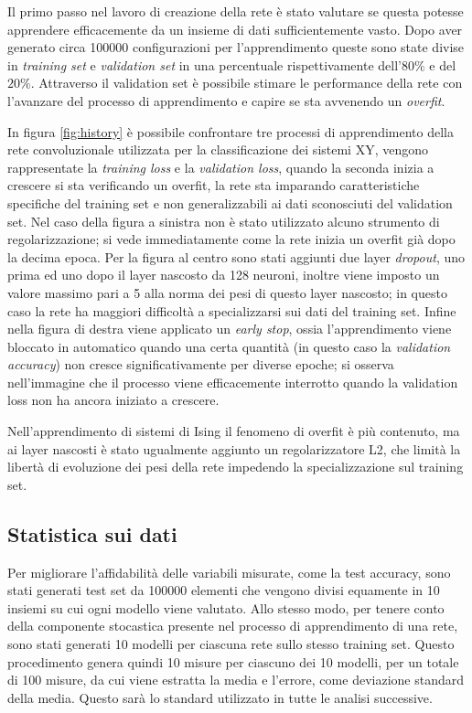 \documentclass{article}
\begin{document}
Il primo passo nel lavoro di creazione della rete è stato valutare se questa potesse apprendere efficacemente da un insieme di dati sufficientemente vasto.
Dopo aver generato circa \num{100000} configurazioni per l'apprendimento queste sono state divise in \emph{training set} e \emph{validation set} in una percentuale rispettivamente dell'$80\%$ e del $20\%$.
Attraverso il validation set è possibile stimare le performance della rete con l'avanzare del processo di apprendimento e capire se sta avvenendo un \emph{overfit}.

In figura \ref{fig:history} è possibile confrontare tre processi di apprendimento della rete convoluzionale utilizzata per la classificazione dei sistemi XY, vengono rappresentate la \emph{training loss} e la \emph{validation loss}, quando la seconda inizia a crescere si sta verificando un overfit, la rete sta imparando caratteristiche specifiche del training set e non generalizzabili ai dati sconosciuti del validation set.
Nel caso della figura a sinistra non è stato utilizzato alcuno strumento di regolarizzazione; si vede immediatamente come la rete inizia un overfit già dopo la decima epoca.
Per la figura al centro sono stati aggiunti due layer \emph{dropout}, uno prima ed uno dopo il layer nascosto da 128 neuroni, inoltre viene imposto un valore massimo pari a 5 alla norma dei pesi di questo layer nascosto; in questo caso la rete ha maggiori difficoltà a specializzarsi sui dati del training set.
Infine nella figura di destra viene applicato un \emph{early stop}, ossia l'apprendimento viene bloccato in automatico quando una certa quantità (in questo caso la \emph{validation accuracy}) non cresce significativamente per diverse epoche; si osserva nell'immagine che il processo viene efficacemente interrotto quando la validation loss non ha ancora iniziato a crescere.

Nell'apprendimento di sistemi di Ising il fenomeno di overfit è più contenuto, ma ai layer nascosti è stato ugualmente aggiunto un regolarizzatore L2, che limità la libertà di evoluzione dei pesi della rete impedendo la specializzazione sul training set.

\subsection{Statistica sui dati} \label{sec:stats}
Per migliorare l'affidabilità delle variabili misurate, come la test accuracy, sono stati generati test set da \num{100000} elementi che vengono divisi equamente in 10 insiemi su cui ogni modello viene valutato.
Allo stesso modo, per tenere conto della componente stocastica presente nel processo di apprendimento di una rete, sono stati generati 10 modelli per ciascuna rete sullo stesso training set.
Questo procedimento genera quindi 10 misure per ciascuno dei 10 modelli, per un totale di 100 misure, da cui viene estratta la media e l'errore, come deviazione standard della media.
Questo sarà lo standard utilizzato in tutte le analisi successive.
\end{document}
